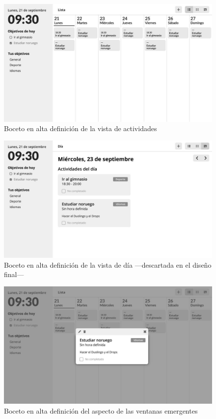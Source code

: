 \documentclass[10pt, a4paper]{aqademic}
\begin{document}
\begin{figure}[hbt!]
	\centering
	\includegraphics[scale=1.25]{img/sprint1-wireframe-lista-actividades.jpg}
	\caption{Boceto en alta definición de la vista de actividades}
\end{figure}

\begin{figure}[hbt!]
	\centering
	\includegraphics[scale=1.25]{img/sprint1-wireframe-actividades.jpg}
	\caption{Boceto en alta definición de la vista de día ---descartada en el diseño final---}
\end{figure}

\begin{figure}[hbt!]
	\centering
	\includegraphics[scale=1.25]{img/sprint1-wireframe-popup.jpg}
	\caption{Boceto en alta definición del aspecto de las ventanas emergentes}
\end{figure}
\end{document}

